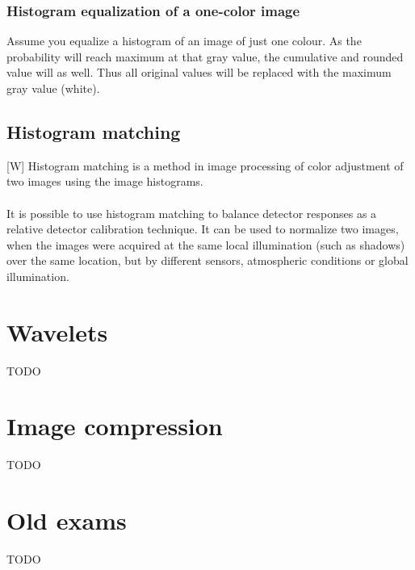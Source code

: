 \documentclass[12pt]{article}
\begin{document}
	\subsubsection{Histogram equalization of a one-color image}
	Assume you equalize a histogram of an image of just one colour. As the probability will reach maximum
	at that gray value, the cumulative and rounded value will as well. Thus all original values will be 
	replaced with the maximum gray value (white).
	\subsection{Histogram matching}
	[W] Histogram matching is a method in image processing of color adjustment of two images using 
	the image histograms.\\
	\\
	It is possible to use histogram matching to balance detector responses as a relative detector 
	calibration technique. It can be used to normalize two images, when the images were acquired at 
	the same local illumination (such as shadows) over the same location, but by different sensors, 
	atmospheric conditions or global illumination.
%	
%	
\section{Wavelets}
	TODO
%	
%
\section{Image compression}
	TODO
%	
%	
\section{Old exams}
	TODO	
\end{document}
